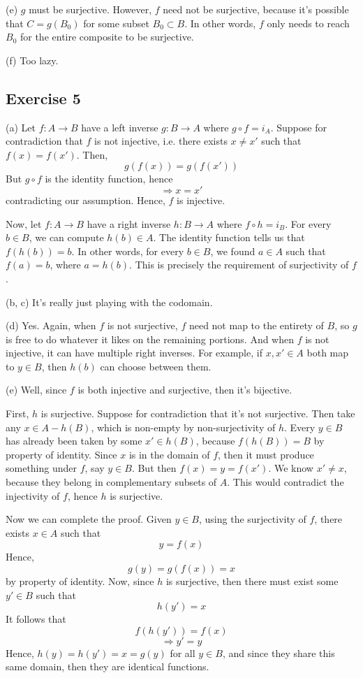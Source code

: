 \documentclass{book}
\begin{document}
\noindent
(e)
$g$ must be surjective. However, $f$ need not be surjective, because it's possible that $C = g(B_0)$ for some subset $B_0 \subset B$. In other words, $f$ only needs to reach $B_0$ for the entire composite to be surjective.

\noindent
(f)
Too lazy.

\subsection*{Exercise 5}
(a)
Let $f : A \rightarrow B$ have a left inverse $g : B \rightarrow A$ where $g \circ f = i_A$. Suppose for contradiction that $f$ is not injective, i.e. there exists $x \neq x'$ such that $f(x) = f(x')$. Then,
$$g(f(x)) = g(f(x'))$$
But $g \circ f$ is the identity function, hence
$$\Rightarrow x = x'$$
contradicting our assumption. Hence, $f$ is injective.

Now, let $f : A \rightarrow B$ have a right inverse $h : B \rightarrow A$ where $f \circ h = i_B$. For every $b \in B$, we can compute $h(b) \in A$. The identity function tells us that $f(h(b)) = b$. In other words, for every $b \in B$, we found $a \in A$ such that $f(a) = b$, where $a = h(b)$. This is precisely the requirement of surjectivity of $f$.

\noindent
(b, c)
It's really just playing with the codomain.

\noindent
(d)
Yes. Again, when $f$ is not surjective, $f$ need not map to the entirety of $B$, so $g$ is free to do whatever it likes on the remaining portions. And when $f$ is not injective, it can have multiple right inverses. For example, if $x, x' \in A$ both map to $y \in B$, then $h(b)$ can choose between them.

\noindent
(e)
Well, since $f$ is both injective and surjective, then it's bijective.

First, $h$ is surjective. Suppose for contradiction that it's not surjective. Then take any $x \in A - h(B)$, which is non-empty by non-surjectivity of $h$. Every $y \in B$ has already been taken by some $x' \in h(B)$, because $f(h(B)) = B$ by property of identity. Since $x$ is in the domain of $f$, then it must produce something under $f$, say $y \in B$. But then $f(x) = y = f(x')$. We know $x' \neq x$, because they belong in complementary subsets of $A$. This would contradict the injectivity of $f$, hence $h$ is surjective.

Now we can complete the proof. Given $y \in B$, using the surjectivity of $f$, there exists $x \in A$ such that
$$y = f(x)$$
Hence,
$$g(y) = g(f(x)) = x$$
by property of identity. Now, since $h$ is surjective, then there must exist some $y' \in B$ such that
$$h(y') = x$$
It follows that
$$f(h(y')) = f(x)$$
$$\Rightarrow y' = y$$
Hence, $h(y) = h(y') = x = g(y)$ for all $y \in B$, and since they share this same domain, then they are identical functions.
\end{document}
